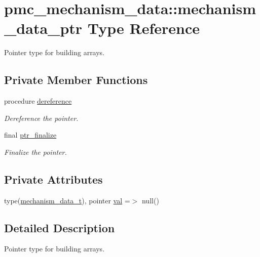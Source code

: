 \hypertarget{structpmc__mechanism__data_1_1mechanism__data__ptr}{}\section{pmc\+\_\+mechanism\+\_\+data\+:\+:mechanism\+\_\+data\+\_\+ptr Type Reference}
\label{structpmc__mechanism__data_1_1mechanism__data__ptr}


Pointer type for building arrays.  


\subsection*{Private Member Functions}
\begin{DoxyCompactItemize}
\item 
procedure \mbox{\hyperlink{structpmc__mechanism__data_1_1mechanism__data__ptr_a5e2a25282dc93a6743eba0d81b8b0e93}{dereference}}
\begin{DoxyCompactList}\small\item\em Dereference the pointer. \end{DoxyCompactList}\item 
final \mbox{\hyperlink{structpmc__mechanism__data_1_1mechanism__data__ptr_a778e4dfd58195d99aa4ae1ae20b1a0fb}{ptr\+\_\+finalize}}
\begin{DoxyCompactList}\small\item\em Finalize the pointer. \end{DoxyCompactList}\end{DoxyCompactItemize}
\subsection*{Private Attributes}
\begin{DoxyCompactItemize}
\item 
type(\mbox{\hyperlink{structpmc__mechanism__data_1_1mechanism__data__t}{mechanism\+\_\+data\+\_\+t}}), pointer \mbox{\hyperlink{structpmc__mechanism__data_1_1mechanism__data__ptr_a52a87d0bc3de564420eb6be29904081e}{val}} =$>$ null()
\end{DoxyCompactItemize}


\subsection{Detailed Description}
Pointer type for building arrays. 


